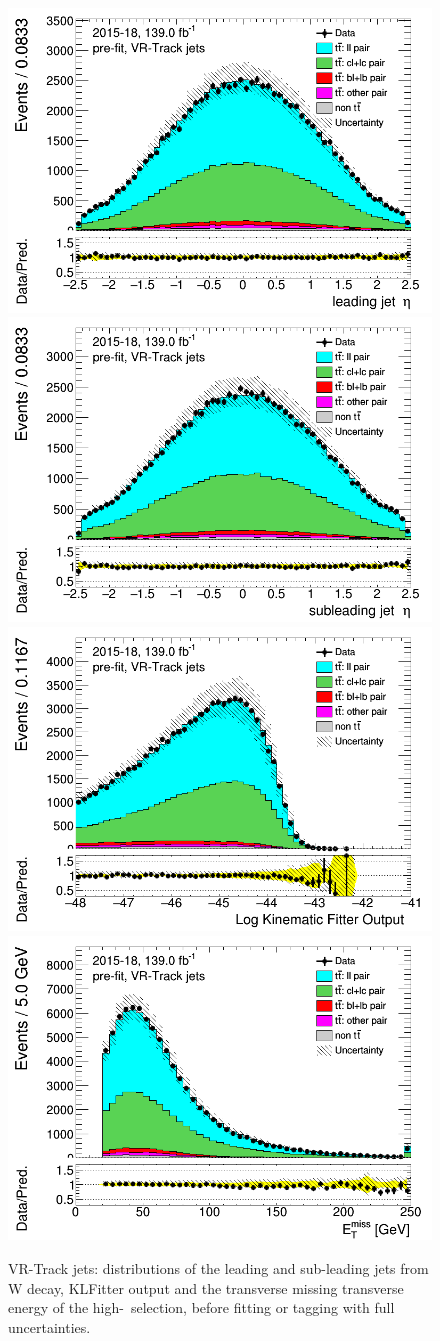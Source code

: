 \documentclass[letterpaper,12pt]{article}
\begin{document}
\newpage	
\begin{figure}[H]
\includegraphics[width=.45\textwidth]{FTAG_plots/pretagNoRwnewonlyVRJetsall/DataMC_h_J0_etatrackjet.png}
\includegraphics[width=.45\textwidth]{FTAG_plots/pretagNoRwnewonlyVRJetsall/DataMC_h_J1_etatrackjet.png}\\
\includegraphics[width=.45\textwidth]{FTAG_plots/pretagNoRwnewonlyVRJetsall/DataMC_h_LLRtrackjet.png}
\includegraphics[width=.45\textwidth]{FTAG_plots/pretagNoRwnewonlyVRJetsall/DataMC_h_METtrackjet.png}\\

\caption{VR-Track jets: distributions of the leading and sub-leading jets 
from W decay, KLFitter output and the transverse missing transverse 
energy of the high-\pt\ selection, before fitting or tagging with 
full uncertainties.} \label{fig:highpT_jets_VRJets}
\end{figure}
\end{document}
